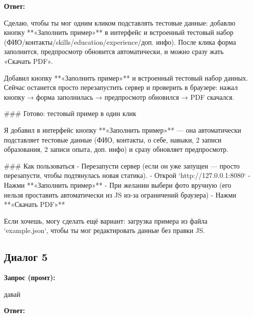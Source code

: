 \documentclass[a4paper, 14pt]{extarticle} %
\begin{document}
\textbf{Ответ:}

\begin{AnswerBlock}

Сделаю, чтобы ты мог одним кликом подставлять тестовые данные: добавлю кнопку **«Заполнить пример»** в интерфейс и встроенный тестовый набор (ФИО/контакты/skills/education/experience/доп. инфо). После клика форма заполнится, предпросмотр обновится автоматически, и можно сразу жать «Скачать PDF».

Добавил кнопку **«Заполнить пример»** и встроенный тестовый набор данных. Сейчас останется просто перезапустить сервер и проверить в браузере: нажал кнопку → форма заполнилась → предпросмотр обновился → PDF скачался.

### Готово: тестовый пример в один клик

Я добавил в интерфейс кнопку **«Заполнить пример»** — она автоматически подставляет тестовые данные (ФИО, контакты, о себе, навыки, 2 записи образования, 2 записи опыта, доп. инфо) и сразу обновляет предпросмотр.

### Как пользоваться
- Перезапусти сервер (если он уже запущен — просто перезапусти, чтобы подтянулась новая статика).
- Открой `http://127.0.0.1:8080`
- Нажми **«Заполнить пример»**
- При желании выбери фото вручную (его нельзя проставить автоматически из JS из-за ограничений браузера)
- Нажми **«Скачать PDF»**

Если хочешь, могу сделать ещё вариант: загрузка примера из файла `example.json`, чтобы ты мог редактировать данные без правки JS.

\end{AnswerBlock}

\subsection*{Диалог 5}

\textbf{Запрос (промт):}

\begin{PromptBlock}

давай

\end{PromptBlock}

\textbf{Ответ:}
\end{document}

